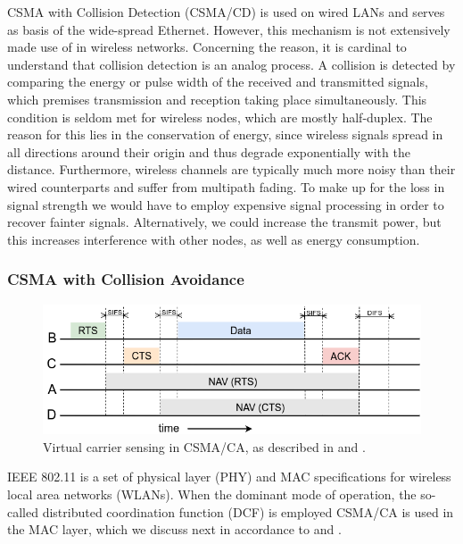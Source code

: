 CSMA with Collision Detection (CSMA/CD) is used on wired LANs and serves as basis of the wide-spread Ethernet. However, this mechanism is not extensively made use of in wireless networks. Concerning the reason, it is cardinal to understand that collision detection is an analog process. A collision is detected by comparing the energy or pulse width of the received and transmitted signals, which premises transmission and reception taking place simultaneously. This condition is seldom met for wireless nodes, which are mostly half-duplex. The reason for this lies in the conservation of energy, since wireless signals spread in all directions around their origin and thus degrade exponentially with the distance. Furthermore, wireless channels are typically much more noisy than their wired counterparts and suffer from multipath fading. To make up for the loss in signal strength we would have to employ expensive signal processing in order to recover fainter signals. Alternatively, we could increase the transmit power, but this increases interference with other nodes, as well as energy consumption.

\subsubsection{CSMA with Collision Avoidance}
\label{sec:csma-ca}

\begin{figure}[tb]
	\label{fig:virtual_carrier_sensing}
	\begin{center}
		\includegraphics[width=14cm]{pictures/virtual_carrier_sensing}
	\end{center}
	\caption[Virtual carrier sensing in CSMA/CA]{Virtual carrier sensing in CSMA/CA, as described in \cite{Tanenbaum02} and \cite{Gast05}.}
\end{figure}

IEEE 802.11 is a set of physical layer (PHY) and MAC specifications for wireless local area networks (WLANs). When the dominant mode of operation, the so-called distributed coordination function (DCF) is employed CSMA/CA is used in the MAC layer, which we discuss next in accordance to \cite{Gast05} and \cite{Garg07}. 


